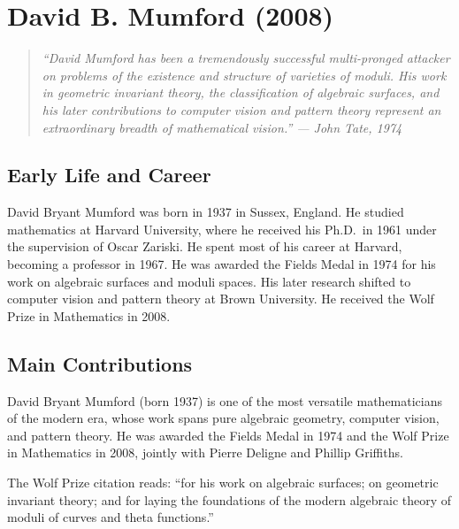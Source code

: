 \providecommand{\cG}{\mathcal{G}}
\providecommand{\Proj}{\operatorname{Proj}}

\chapter{David B. Mumford (2008)}

\begin{quote}
\it ``David Mumford has been a tremendously successful multi-pronged attacker on problems of the existence and structure of varieties of moduli. His work in geometric invariant theory, the classification of algebraic surfaces, and his later contributions to computer vision and pattern theory represent an extraordinary breadth of mathematical vision.'' --- John Tate, 1974
\end{quote}

\section{Early Life and Career}

David Bryant Mumford was born in 1937 in Sussex, England. He studied mathematics at Harvard University, where he received his Ph.D.\ in 1961 under the supervision of Oscar Zariski. He spent most of his career at Harvard, becoming a professor in 1967. He was awarded the Fields Medal in 1974 for his work on algebraic surfaces and moduli spaces. His later research shifted to computer vision and pattern theory at Brown University. He received the Wolf Prize in Mathematics in 2008.

\section{Main Contributions}

David Bryant Mumford (born 1937) is one of the most versatile mathematicians of the modern era, whose work spans pure algebraic geometry, computer vision, and pattern theory. He was awarded the Fields Medal in 1974 and the Wolf Prize in Mathematics in 2008, jointly with Pierre Deligne and Phillip Griffiths.

The Wolf Prize citation reads: ``for his work on algebraic surfaces; on geometric invariant theory; and for laying the foundations of the modern algebraic theory of moduli of curves and theta functions.''

